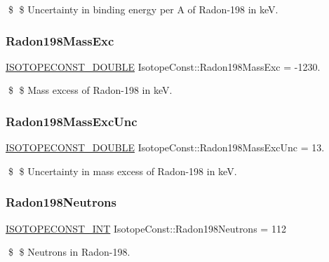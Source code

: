 \$ \$ Uncertainty in binding energy per A of Radon-\/198 in keV. \mbox{\label{group___isotope_const-_radon-_rn198_ga2f22f1b933186bd268cf487242b2fbe5}} 
\subsubsection{\texorpdfstring{Radon198\+Mass\+Exc}{Radon198MassExc}}
{\footnotesize\ttfamily \mbox{\hyperlink{group___isotope_const-_macros_ga8f45a7272ce02c0b4c65c44636ed719a}{I\+S\+O\+T\+O\+P\+E\+C\+O\+N\+S\+T\+\_\+\+D\+O\+U\+B\+LE}} Isotope\+Const\+::\+Radon198\+Mass\+Exc = -\/1230.}

\$ \$ Mass excess of Radon-\/198 in keV. \mbox{\label{group___isotope_const-_radon-_rn198_ga747e960b1fd23b7b563309f7966e6269}} 
\subsubsection{\texorpdfstring{Radon198\+Mass\+Exc\+Unc}{Radon198MassExcUnc}}
{\footnotesize\ttfamily \mbox{\hyperlink{group___isotope_const-_macros_ga8f45a7272ce02c0b4c65c44636ed719a}{I\+S\+O\+T\+O\+P\+E\+C\+O\+N\+S\+T\+\_\+\+D\+O\+U\+B\+LE}} Isotope\+Const\+::\+Radon198\+Mass\+Exc\+Unc = 13.}

\$ \$ Uncertainty in mass excess of Radon-\/198 in keV. \mbox{\label{group___isotope_const-_radon-_rn198_ga382033795f64831f0da803ed9857df7f}} 
\subsubsection{\texorpdfstring{Radon198\+Neutrons}{Radon198Neutrons}}
{\footnotesize\ttfamily \mbox{\hyperlink{group___isotope_const-_macros_ga5f18360b3e99483a35c32d789e62621c}{I\+S\+O\+T\+O\+P\+E\+C\+O\+N\+S\+T\+\_\+\+I\+NT}} Isotope\+Const\+::\+Radon198\+Neutrons = 112}

\$ \$ Neutrons in Radon-\/198. \mbox{\label{group___isotope_const-_radon-_rn198_gad472aeff5367242c2a4cee3e41c3d2dd}} 
